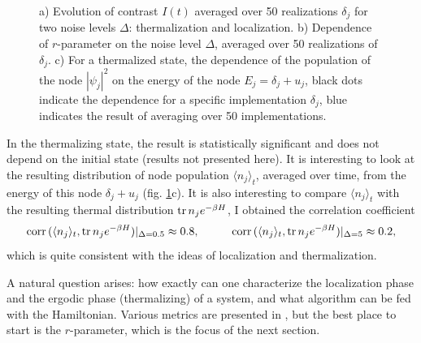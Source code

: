 \begin{figure}[h]
    \caption{a) Evolution of contrast $I(t)$ averaged over 50 realizations $\delta_j$ for two noise levels $\Delta$: thermalization and localization. b) Dependence of $r$-parameter on the noise level $\Delta$, averaged over 50 realizations of $\delta_j$. c) For a thermalized state, the dependence of the population of the node $|\psi_j|^2$ on the energy of the node $E_j = \delta_j + u_j$, black dots indicate the dependence for a specific implementation $\delta_j$, blue indicates the result of averaging over 50 implementations.}
    \label{fig:2Dtherm}
\end{figure}



In the thermalizing state, the result is statistically significant and does not depend on the initial state (results not presented here). It is interesting to look at the resulting distribution of node population $\langle n_j\rangle_t$, averaged over time, from the energy of this node $\delta_j + u_j$ (fig. \ref{fig:2Dtherm}c). It is also interesting to compare $\langle n_j\rangle_t$ with the resulting thermal distribution $\mathop{\mathrm{tr}}\nolimits n_j e^{-\beta H}$,  I obtained the correlation coefficient 
\begin{equation*}
    \text{corr}\,(\langle n_j\rangle_t, \tr n_j e^{-\beta H})|_{\Delta=0.5}  \approx 0.8,
    \hspace{10 mm} 
    \text{corr}\,(\langle n_j\rangle_t, \tr n_j e^{-\beta H})|_{\Delta=5}  \approx 0.2,
\end{equation*}
which is quite consistent with the ideas of localization and thermalization.




A natural question arises: how exactly can one characterize the localization phase and the ergodic phase (thermalizing) of a system, and what algorithm can be fed with the Hamiltonian. Various metrics are presented in \cite{pal_many-body_2010}, but the best place to start is the $r$-parameter, which is the focus of the next section.







